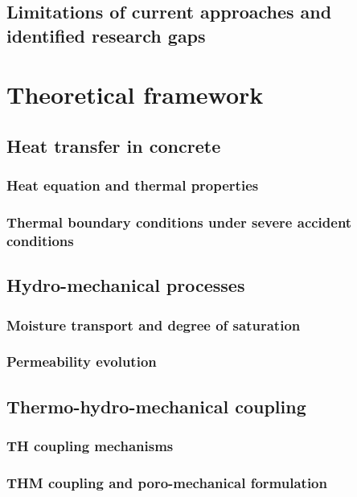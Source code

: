 \documentclass[twoside]{report}
\begin{document}
\section{Limitations of current approaches and identified research gaps}


\cleardoublepage
\chapter{Theoretical framework}

\section{Heat transfer in concrete}
\subsection{Heat equation and thermal properties}
\subsection{Thermal boundary conditions under severe accident conditions}

\section{Hydro-mechanical processes}
\subsection{Moisture transport and degree of saturation}
\subsection{Permeability evolution}

\section{Thermo-hydro-mechanical coupling}
\subsection{TH coupling mechanisms}
\subsection{THM coupling and poro-mechanical formulation}
\end{document}
